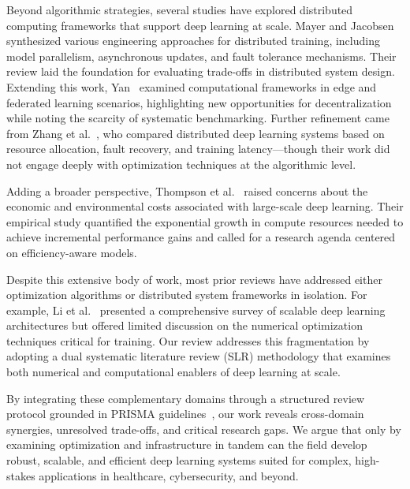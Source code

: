 \documentclass[acmsmall]{acmart}
\begin{document}
Beyond algorithmic strategies, several studies have explored distributed computing frameworks that support deep learning at scale. Mayer and Jacobsen~\cite{mayer2020scalable} synthesized various engineering approaches for distributed training, including model parallelism, asynchronous updates, and fault tolerance mechanisms. Their review laid the foundation for evaluating trade-offs in distributed system design. Extending this work, Yan~\cite{yan2023computational} examined computational frameworks in edge and federated learning scenarios, highlighting new opportunities for decentralization while noting the scarcity of systematic benchmarking. Further refinement came from Zhang et al.~\cite{zhang2023distributed}, who compared distributed deep learning systems based on resource allocation, fault recovery, and training latency—though their work did not engage deeply with optimization techniques at the algorithmic level.

Adding a broader perspective, Thompson et al.~\cite{thompson2020computational} raised concerns about the economic and environmental costs associated with large-scale deep learning. Their empirical study quantified the exponential growth in compute resources needed to achieve incremental performance gains and called for a research agenda centered on efficiency-aware models.

Despite this extensive body of work, most prior reviews have addressed either optimization algorithms or distributed system frameworks in isolation. For example, Li et al.~\cite{li2020survey} presented a comprehensive survey of scalable deep learning architectures but offered limited discussion on the numerical optimization techniques critical for training. Our review addresses this fragmentation by adopting a dual systematic literature review (SLR) methodology that examines both numerical and computational enablers of deep learning at scale.

By integrating these complementary domains through a structured review protocol grounded in PRISMA guidelines~\citet{moher2009preferred}, 
our work reveals cross-domain synergies, unresolved trade-offs, and critical research gaps. We argue that only by examining optimization and infrastructure in tandem can 
the field develop robust, scalable, and efficient deep learning systems suited for complex, high-stakes applications in healthcare, cybersecurity, and beyond.
\end{document}
